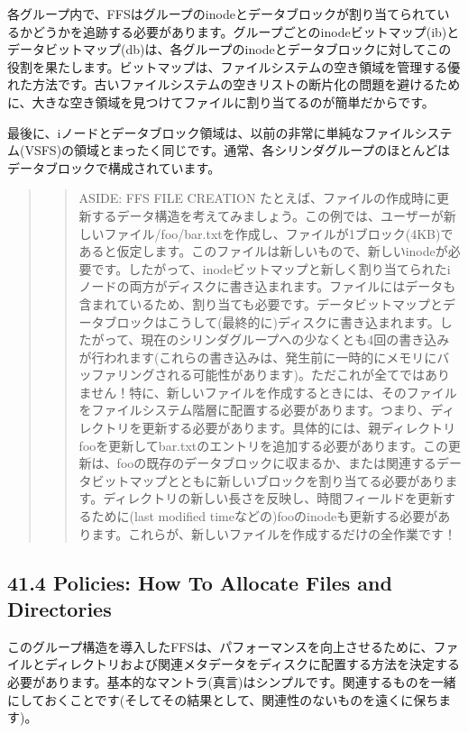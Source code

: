各グループ内で、FFSはグループのinodeとデータブロックが割り当てられているかどうかを追跡する必要があります。グループごとのinodeビットマップ(ib)とデータビットマップ(db)は、各グループのinodeとデータブロックに対してこの役割を果たします。ビットマップは、ファイルシステムの空き領域を管理する優れた方法です。古いファイルシステムの空きリストの断片化の問題を避けるために、大きな空き領域を見つけてファイルに割り当てるのが簡単だからです。

最後に、iノードとデータブロック領域は、以前の非常に単純なファイルシステム(VSFS)の領域とまったく同じです。通常、各シリンダグループのほとんどはデータブロックで構成されています。

\begin{quote}
\begin{quote}
ASIDE: FFS FILE CREATION
たとえば、ファイルの作成時に更新するデータ構造を考えてみましょう。この例では、ユーザーが新しいファイル/foo/bar.txtを作成し、ファイルが1ブロック(4KB)であると仮定します。このファイルは新しいもので、新しいinodeが必要です。したがって、inodeビットマップと新しく割り当てられたiノードの両方がディスクに書き込まれます。ファイルにはデータも含まれているため、割り当ても必要です。データビットマップとデータブロックはこうして(最終的に)ディスクに書き込まれます。したがって、現在のシリンダグループへの少なくとも4回の書き込みが行われます(これらの書き込みは、発生前に一時的にメモリにバッファリングされる可能性があります)。ただこれが全てではありません！特に、新しいファイルを作成するときには、そのファイルをファイルシステム階層に配置する必要があります。つまり、ディレクトリを更新する必要があります。具体的には、親ディレクトリfooを更新してbar.txtのエントリを追加する必要があります。この更新は、fooの既存のデータブロックに収まるか、または関連するデータビットマップとともに新しいブロックを割り当てる必要があります。ディレクトリの新しい長さを反映し、時間フィールドを更新するために(last
modified
timeなどの)fooのinodeも更新する必要があります。これらが、新しいファイルを作成するだけの全作業です！
\end{quote}
\end{quote}

\hypertarget{policies-how-to-allocate-files-and-directories}{%
\subsection*{41.4 Policies: How To Allocate Files and
Directories}\label{policies-how-to-allocate-files-and-directories}}

このグループ構造を導入したFFSは、パフォーマンスを向上させるために、ファイルとディレクトリおよび関連メタデータをディスクに配置する方法を決定する必要があります。基本的なマントラ(真言)はシンプルです。関連するものを一緒にしておくことです(そしてその結果として、関連性のないものを遠くに保ちます)。

